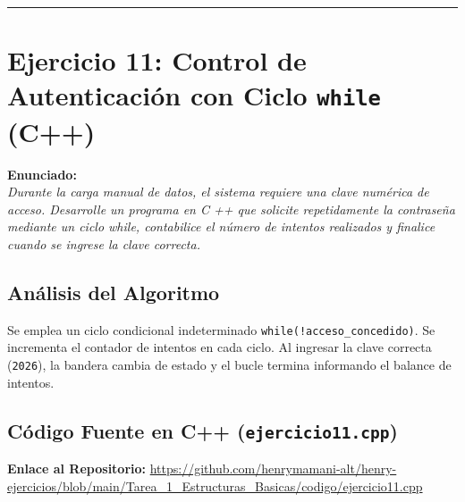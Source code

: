 \documentclass[12pt]{article}
\begin{document}
\vspace{5mm}
\hrule
\newpage

\section*{Ejercicio 11: Control de Autenticación con Ciclo \texttt{while} (C++)}

\noindent\textbf{Enunciado:}\\
\textit{Durante la carga manual de datos, el sistema requiere una clave numérica de acceso. Desarrolle un programa en C ++ que solicite repetidamente la contraseña mediante un ciclo while, contabilice el número de intentos realizados y finalice cuando se ingrese la clave correcta.}

\subsection*{Análisis del Algoritmo}
Se emplea un ciclo condicional indeterminado \texttt{while(!acceso\_concedido)}. Se incrementa el contador de intentos en cada ciclo. Al ingresar la clave correcta (\texttt{2026}), la bandera cambia de estado y el bucle termina informando el balance de intentos.

\subsection*{Código Fuente en C++ (\texttt{ejercicio11.cpp})}
\noindent\textbf{Enlace al Repositorio:} \url{https://github.com/henrymamani-alt/henry-ejercicios/blob/main/Tarea_1_Estructuras_Basicas/codigo/ejercicio11.cpp}
\end{document}
